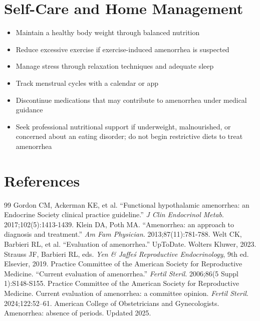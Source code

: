 \section*{Self-Care and Home Management}
\begin{itemize}
\item Maintain a healthy body weight through balanced nutrition
\item Reduce excessive exercise if exercise-induced amenorrhea is suspected
\item Manage stress through relaxation techniques and adequate sleep
\item Track menstrual cycles with a calendar or app
\item Discontinue medications that may contribute to amenorrhea under medical guidance
\item Seek professional nutritional support if underweight, malnourished, or concerned about an eating disorder; do not begin restrictive diets to treat amenorrhea
\end{itemize}

\section*{References}
\begin{thebibliography}{99}
 Gordon CM, Ackerman KE, et al. ``Functional hypothalamic amenorrhea: an Endocrine Society clinical practice guideline.'' \textit{J Clin Endocrinol Metab}. 2017;102(5):1413-1439.
 Klein DA, Poth MA. ``Amenorrhea: an approach to diagnosis and treatment.'' \textit{Am Fam Physician}. 2013;87(11):781-788.
 Welt CK, Barbieri RL, et al. ``Evaluation of amenorrhea.'' UpToDate. Wolters Kluwer, 2023.
 Strauss JF, Barbieri RL, eds. \textit{Yen \& Jaffe\'s Reproductive Endocrinology}, 9th ed. Elsevier, 2019.
 Practice Committee of the American Society for Reproductive Medicine. ``Current evaluation of amenorrhea.'' \textit{Fertil Steril}. 2006;86(5 Suppl 1):S148-S155.
 Practice Committee of the American Society for Reproductive Medicine. Current evaluation of amenorrhea: a committee opinion. \textit{Fertil Steril}. 2024;122:52--61.
 American College of Obstetricians and Gynecologists. Amenorrhea: absence of periods. Updated 2025.
\end{thebibliography}
